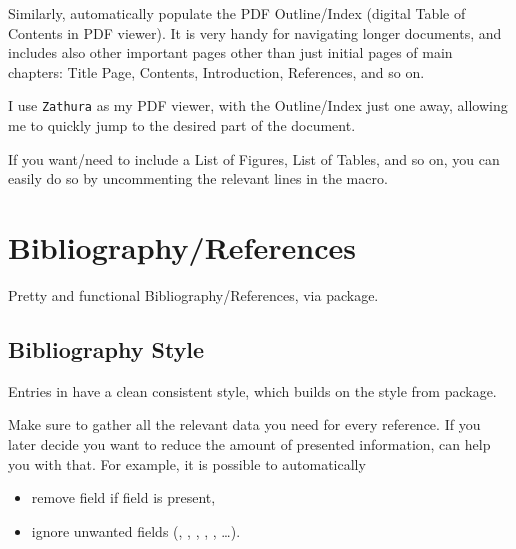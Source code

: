 Similarly, automatically populate the PDF Outline/Index (digital Table of Contents in PDF viewer).
It is very handy for navigating longer documents, and includes also other important pages other than just initial pages of main chapters: Title Page, Contents, Introduction, References, and so on.
\begin{remark}
    I use \texttt{Zathura} as my PDF viewer, with the Outline/Index just one  away, allowing me to quickly jump to the desired part of the document.
\end{remark}

\begin{remark}
    If you want/need to include a List of Figures, List of Tables, and so on, you can easily do so by uncommenting the relevant lines in the \custommacro{\contentsandlists} macro.
\end{remark}


\section{Bibliography/References}%
\label{sec:Bibliography/References}

Pretty and functional Bibliography/References, via  package.

\subsection{Bibliography Style}%
\label{sub:Bibliography Style}

Entries in  have a clean consistent style, which builds on the  style from  package.

\begin{tip}
    Make sure to gather all the relevant data you need for every reference.
    If you later decide you want to reduce the amount of presented information,  can help you with that.
    For example, it is possible to automatically
    \begin{itemize}
        \item remove  field if  field is present,
        \item ignore unwanted fields (, , , , , \ldots). \qedhere*
    \end{itemize}
\end{tip}

